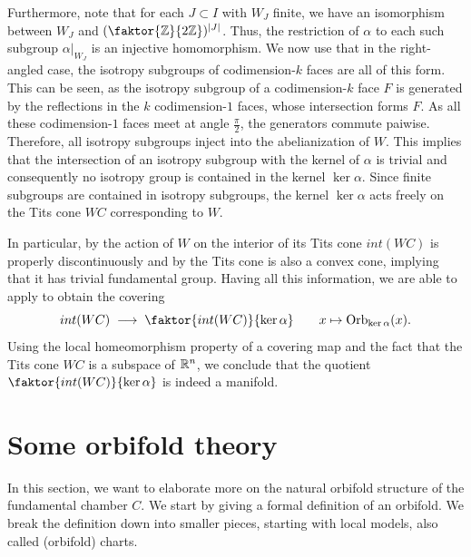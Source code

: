 Furthermore, note that for each \(J \subset I\) with \(W_J\) finite, we have an isomorphism between \(W_J\) and \((\faktor{\Z}{2\Z})^{\abs{J}}\).
Thus, the restriction of \(\alpha\) to each such subgroup \(\alpha\vert_{W_J}\) is an injective homomorphism.
We now use that in the right-angled case, the isotropy subgroups of codimension-\(k\) faces are all of this form.
This can be seen, as the isotropy subgroup of a codimension-\(k\) face \(F\) is generated by the reflections in the \(k\) codimension-\(1\) faces, whose intersection forms \(F\).
As all these codimension-\(1\) faces meet at angle \(\frac{\pi}{2}\), the generators commute paiwise.
Therefore, all isotropy subgroups inject into the abelianization of \(W\).
This implies that the intersection of an isotropy subgroup with the kernel of \(\alpha\) is trivial and consequently no isotropy group is contained in the kernel \(\ker\alpha\).
Since finite subgroups are contained in isotropy subgroups, the kernel \(\ker\alpha\) acts freely on the Tits cone \(WC\) corresponding to \(W\).

In particular, by  the action of \(W\) on the interior of its Tits cone \(int(WC)\) is properly discontinuously and by  the Tits cone is also a convex cone, implying that it has trivial fundamental group.
Having all this information, we are able to apply  to obtain the covering
\[int(WC) \;\longrightarrow\; \faktor{int(WC)}{\ker\alpha} \qquad x \mapsto \text{Orb}_{\ker\alpha}(x).\]
Using the local homeomorphism property of a covering map and the fact that the Tits cone \(WC\) is a subspace of \(\mathbb{R}^n\), we conclude that the quotient \(\faktor{int(WC)}{\ker\alpha}\) is indeed a manifold.

    


\section{Some orbifold theory}

In this section, we want to elaborate more on the natural orbifold structure of the fundamental chamber \(C\).
We start by giving a formal definition of an orbifold.
We break the definition down into smaller pieces, starting with local models, also called (orbifold) charts.

